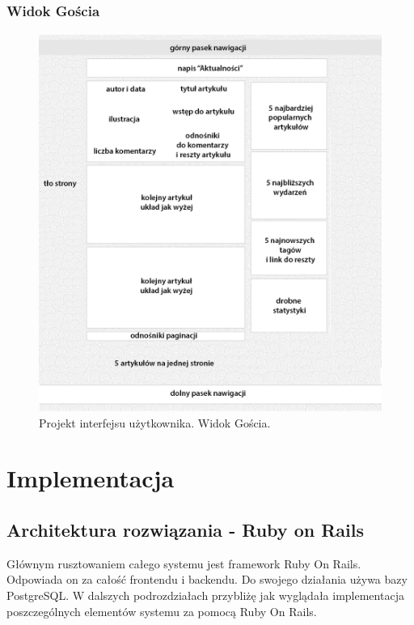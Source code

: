 \documentclass[openright]{xmgr}
\begin{document}
\newpage

\subsection{Widok Gościa}
\begin{figure}[!tbh]
\centering
\includegraphics[width=.9\linewidth]{fig/gui_guest}
\caption{Projekt interfejsu użytkownika. Widok Gościa.\label{RYS.5}}
\end{figure}

\chapter{Implementacja}

\section{Architektura rozwiązania - Ruby on Rails}
Głównym rusztowaniem całego systemu jest framework Ruby On Rails. Odpowiada on za całość frontendu i backendu. Do swojego działania używa bazy PostgreSQL. W dalszych podrozdziałach przybliżę jak wyglądała implementacja poszczególnych elementów systemu za pomocą Ruby On Rails.
\end{document}
